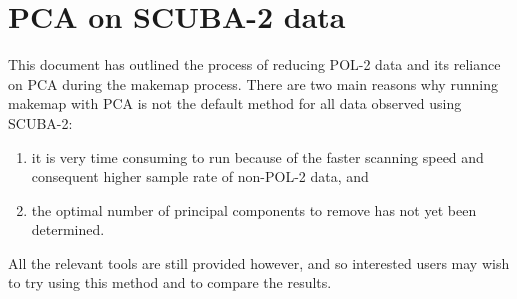 \chapter{PCA on SCUBA-2 data}
\label{app:pca}

This document has outlined the process of reducing POL-2 data and its
reliance on PCA during the makemap process. There are two main reasons
why running makemap with PCA is not the default method for all data observed
using SCUBA-2:

\begin{enumerate}
\item it is very time consuming to run because of the faster scanning speed
and consequent higher sample rate of non-POL-2 data, and

\item the optimal number of principal components to remove has not yet been
determined.
\end{enumerate}

All the relevant tools are still provided however, and so interested users
may wish to try using this method and to compare the results.

